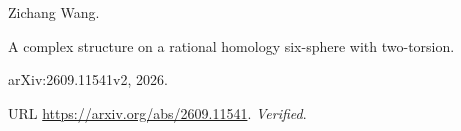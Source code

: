 Zichang Wang.

\newblock A complex structure on a rational homology six-sphere with
  two-torsion.

\newblock arXiv:2609.11541v2, 2026.

\newblock URL \url{https://arxiv.org/abs/2609.11541}.
\newblock \emph{Verified}.

